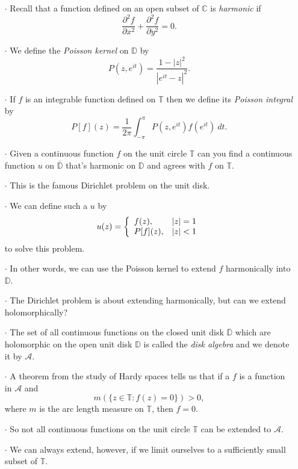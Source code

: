 \documentclass{beamer}
\begin{document}
\begin{frame}
\begin{enumerate}
\item[$\cdot$] Recall that a function defined on an open subset of $\mathbb{C}$ is \emph{harmonic} if
\[
	\frac{\partial^2f}{\partial x^2} + \frac{\partial^2f}{\partial y^2} = 0.
\]
\item[$\cdot$] We define the \emph{Poisson kernel} on $\mathbb{D}$ by
\[
	P(z, e^{it}) = \frac{1 - |z|^2}{|e^{it} - z|^2}.
\]
\item[$\cdot$] If $f$ is an integrable function defined on $\mathbb{T}$ then we define its \emph{Poisson integral} by
\[
	P[f](z) = \frac{1}{2\pi} \int_{-\pi}^{\pi} P(z, e^{it})f(e^{it})\ dt.
\]
\end{enumerate}
\end{frame}

\begin{frame}
\begin{enumerate}
\item[$\cdot$] Given a continuous function $f$ on the unit circle $\mathbb{T}$ can you find a continuous function $u$ on $\overline{\mathbb{D}}$ that's harmonic on $\mathbb{D}$ and agrees with $f$ on $\mathbb{T}$.
\item[$\cdot$] This is the famous Dirichlet problem on the unit disk.
\item[$\cdot$] We can define such a $u$ by
\[
	u(z) = \left \{
	\begin{array}{l l}
		f(z), & |z| = 1\\
		P[f](z), & |z| < 1
	\end{array}
	\right .
\]
to solve this problem.
\item[$\cdot$] In other words, we can use the Poisson kernel to extend $f$ harmonically into $\mathbb{D}$.
\end{enumerate}
\end{frame}

\begin{frame}
\begin{enumerate}
\item[$\cdot$] The Dirichlet problem is about extending harmonically, but can we extend holomorphically?
\item[$\cdot$] The set of all continuous functions on the closed unit disk $\overline{\mathbb{D}}$ which are holomorphic on the open unit disk  $\mathbb{D}$ is called the \emph{disk algebra} and we denote it by $\mathcal{A}$.
\item[$\cdot$] A theorem from the study of Hardy spaces tells us that if a $f$ is a function in $\mathcal{A}$ and
\[
	m(\{z \in \mathbb{T} \colon f(z) = 0\}) > 0,
\]
where $m$ is the arc length measure on $\mathbb{T}$, then $f = 0$.
\item[$\cdot$] So not all continuous functions on the unit circle $\mathbb{T}$ can be extended to $\mathcal{A}$.
\item[$\cdot$] We can always extend, however, if we limit ourselves to a sufficiently small subset of $\mathbb{T}$.
\end{enumerate}
\end{frame}
\end{document}
